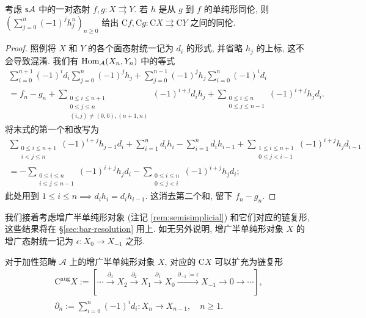 \begin{proposition}
	考虑 $\mathsf{s}\mathcal{A}$ 中的一对态射 $f, g: X \rightrightarrows Y$. 若 $h$ 是从 $g$ 到 $f$ 的单纯形同伦, 则 $\left( \sum_{j=0}^n (-1)^j h^n_j \right)_{n \geq 0}$ 给出 $\mathrm{C}f, \mathrm{C}g: \mathrm{C}X \rightrightarrows \mathrm{C}Y$ 之间的同伦.
\end{proposition}
\begin{proof}
	照例将 $X$ 和 $Y$ 的各个面态射统一记为 $d_i$ 的形式, 并省略 $h_j$ 的上标, 这不会导致混淆. 我们有 $\operatorname{Hom}_{\mathcal{A}}(X_n, Y_n)$ 中的等式
	\begin{multline*}
		\sum_{i=0}^{n+1} (-1)^i d_i \sum_{j=0}^n (-1)^j h_j + \sum_{j=0}^{n-1} (-1)^j h_j \sum_{i=0}^n (-1)^i d_i \\
		= f_n - g_n
		+ \sum_{\substack{0 \leq i \leq n+1 \\ 0 \leq j \leq n \\ (i,j) \neq (0, 0), (n+1, n)}} (-1)^{i+j} d_i h_j
		+ \sum_{\substack{0 \leq i \leq n \\ 0 \leq j \leq n-1}} (-1)^{i+j} h_j d_i .
	\end{multline*}
	将末式的第一个和改写为
	\begin{align*}
		\sum_{\substack{0 \leq i \leq n+1 \\ i < j \leq n}} (-1)^{i+j} h_{j-1} d_i
		+ \sum_{i=1}^n d_i h_i - \sum_{i=1}^n d_i h_{i-1} 
		+ \sum_{\substack{1 \leq i \leq n+1 \\ 0 \leq j < i-1}} (-1)^{i+j} h_j d_{i-1} \\
		= -\sum_{\substack{0 \leq i \leq n \\ i \leq j \leq n-1}} (-1)^{i+j} h_j d_i
		- \sum_{\substack{0 \leq i \leq n \\ 0 \leq j < i}} (-1)^{i+j} h_j d_i ;
	\end{align*}
	此处用到 $1 \leq i \leq n \implies d_i h_i = d_i h_{i-1}$. 这消去第二个和, 留下 $f_n - g_n$.
\end{proof}

我们接着考虑增广半单纯形对象 (注记 \ref{rem:semisimplicial}) 和它们对应的链复形, 这些结果将在 \S\ref{sec:bar-resolution} 用上. 如无另外说明, 增广半单纯形对象 $X$ 的增广态射统一记为 $\epsilon: X_0 \to X_{-1}$ 之形.

\begin{definition}\label{def:augmented-C-cplx}
	对于加性范畴 $\mathcal{A}$ 上的增广半单纯形对象 $X$, 对应的 $\mathrm{C}X$ 可以扩充为链复形
	\begin{equation*}
		\begin{gathered}
			\mathrm{C}^{\mathrm{aug}} X := \left[ \cdots \xrightarrow{\partial_3} X_2 \xrightarrow{\partial_2} X_1 \xrightarrow{\partial_1} X_0 \xrightarrow{\partial_{-1} := \epsilon} X_{-1} \to 0 \to \cdots \right] , \\
			\partial_n := \sum_{i=0}^n (-1)^i d_i : X_n \to X_{n-1}, \quad n \geq 1.
		\end{gathered}
	\end{equation*}
\end{definition}


